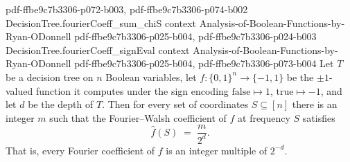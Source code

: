 \begin{theorem}
  {pdf-ffbe9c7b3306-p072-b003,
    pdf-ffbe9c7b3306-p074-b002}
\proofstep
  {DecisionTree.fourierCoeff_sum_chiS}
  {context}
  {Analysis-of-Boolean-Functions-by-Ryan-ODonnell}
  {pdf-ffbe9c7b3306-p025-b004,
    pdf-ffbe9c7b3306-p024-b003}
\proofstep
  {DecisionTree.fourierCoeff_signEval}
  {context}
  {Analysis-of-Boolean-Functions-by-Ryan-ODonnell}
  {pdf-ffbe9c7b3306-p025-b004,
    pdf-ffbe9c7b3306-p073-b004}
Let $T$ be a decision tree on $n$ Boolean variables, let $f\colon\{0,1\}^n\to\{-1,1\}$
be the $\pm1$-valued function it computes under the sign encoding $\mathrm{false}\mapsto
1$, $\mathrm{true}\mapsto -1$, and let $d$ be the depth of $T$. Then for every set of
coordinates $S\subseteq[n]$ there is an integer $m$ such that the Fourier--Walsh
coefficient of $f$ at frequency $S$ satisfies
\[
  \hat f(S) \;=\; \frac{m}{2^{d}}.
\]
That is, every Fourier coefficient of $f$ is an integer multiple of $2^{-d}$.
\end{theorem}

